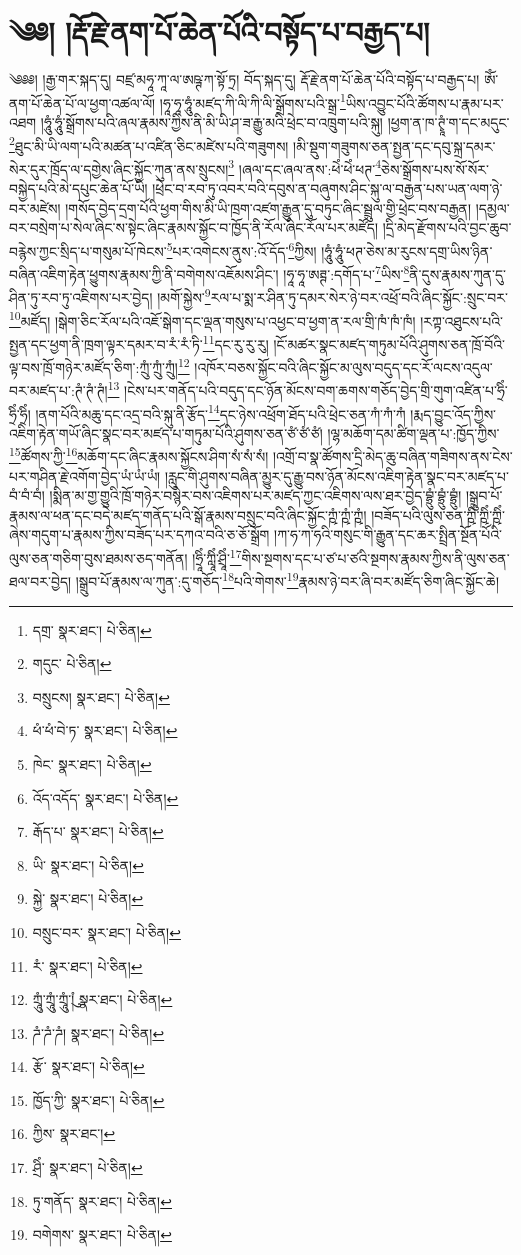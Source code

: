 \setcounter{footnote}{0} 
\chapter{༄༅། །རྡོ་རྗེ་ནག་པོ་ཆེན་པོའི་བསྟོད་པ་བརྒྱད་པ།}༄༅༅། །རྒྱ་གར་སྐད་དུ། བཛྲ་མཧཱ་ཀཱ་ལ་ཨཥྚ་ཀ་སྟོ་ཏྲ། བོད་སྐད་དུ། རྡོ་རྗེ་ནག་པོ་ཆེན་པོའི་བསྟོད་པ་བརྒྱད་པ། ཨོཾ་ནག་པོ་ཆེན་པོ་ལ་ཕྱག་འཚལ་ལོ། །ཧཱ་ཧཱ་ཧཱུཾ་མཛད་ཀི་ལི་ཀི་ལི་སྒྲོགས་པའི་སྒྲ་\footnote{དགྲ་  སྣར་ཐང་།  པེ་ཅིན། }ཡིས་འབྱུང་པོའི་ཚོགས་པ་རྣམ་པར་འཐག །ཧཱུཾ་ཧཱུཾ་སྒྲོགས་པའི་ཞལ་རྣམས་ཀྱིས་ནི་མི་ཡི་ཤ་ཟ་རྒྱུ་མའི་ཕྲེང་བ་འཁྲུག་པའི་སྐུ། །ཕྱག་ན་ཁ་ཊྭཱཾ་ག་དང་མདུང་\footnote{གདུང་  པེ་ཅིན། }ཐུང་མི་ཡི་ལག་པའི་མཚན་པ་འཛིན་ཅིང་མཛེས་པའི་གཟུགས། །མི་སྡུག་གཟུགས་ཅན་སྤྱན་དང་དབུ་སྐྲ་དམར་སེར་དུར་ཁྲོད་ལ་དགྱེས་ཞིང་སྐྱོང་ཀུན་ནས་སྲུངས།\footnote{བསྲུངས།  སྣར་ཐང་།  པེ་ཅིན། } །ཞལ་དང་ཞལ་ནས་:ཕེཾ་ཕེཾ་ཕཊ་\footnote{ཕཾ་ཕཾ་བེ་ཏ་  སྣར་ཐང་།  པེ་ཅིན། }ཅེས་སྒྲོགས་པས་སོ་སོར་བསྐྱེད་པའི་མེ་དཔུང་ཆེན་པོ་ཡི། །ཕྲེང་བ་རབ་ཏུ་འབར་བའི་དབུས་ན་བཞུགས་ཤིང་སྐུ་ལ་བརྒྱན་པས་ཡན་ལག་ཉེ་བར་མཛེས། །གསོད་བྱེད་དྲག་པོའི་ཕྱག་གིས་མི་ཡི་ཁྲག་འཛག་རྒྱུན་དུ་བཏུང་ཞིང་སྦྲུལ་གྱི་ཕྲེང་བས་བརྒྱན། །དམྱལ་བར་བསྲེག་པ་སེལ་ཞིང་ས་སྟེང་ཞིང་རྣམས་སྐྱོང་བ་ཁྱོད་ནི་རོལ་ཞིང་རོལ་པར་མཛོད། །དྲི་མེད་རྫོགས་པའི་བྱང་ཆུབ་བརྙེས་ཀྱང་སྲིད་པ་གསུམ་པོ་ཁེངས་\footnote{ཁེང་  སྣར་ཐང་།  པེ་ཅིན། }པར་འགེངས་ནུས་:འོ་དོད་\footnote{འོད་འདོད་  སྣར་ཐང་།  པེ་ཅིན། }ཀྱིས། །ཧཱུཾ་ཧཱུཾ་ཕཊ་ཅེས་མ་རུངས་དགྲ་ཡིས་ཉིན་བཞིན་འཇིག་རྟེན་ཕྱུགས་རྣམས་ཀྱི་ནི་བགེགས་འཇོམས་ཤིང་། །ཧཱ་ཧཱ་ཨཊྚ་:དགོད་པ་\footnote{རྒོད་པ་  སྣར་ཐང་།  པེ་ཅིན། }ཡིས་\footnote{ཡི་  སྣར་ཐང་།  པེ་ཅིན། }ནི་དུས་རྣམས་ཀུན་དུ་ཤིན་ཏུ་རབ་ཏུ་འཇིགས་པར་བྱེད། །མགོ་སྐྱེས་\footnote{སྐྱེ་  སྣར་ཐང་།  པེ་ཅིན། }རལ་པ་སྨ་ར་ཤིན་ཏུ་དམར་སེར་ཉེ་བར་འཕྲོ་བའི་ཞིང་སྐྱོང་:སྲུང་བར་\footnote{བསྲུང་བར་  སྣར་ཐང་།  པེ་ཅིན། }མཛོད། །སྒེག་ཅིང་རོལ་པའི་འཇོ་སྒེག་དང་ལྡན་གསུས་པ་འཕྱང་བ་ཕྱག་ན་རལ་གྲི་ཁཾ་ཁཾ་ཁཾ། །རཀྟ་འཐུངས་པའི་སྤྱན་དང་ཕྱག་ནི་ཁྲག་ལྟར་དམར་བ་རཾ་རཾ་ཏི་\footnote{རཾ་  སྣར་ཐང་།  པེ་ཅིན། }དང་རུ་རུ་རུ། །ངོ་མཚར་སྣང་མཛད་གཏུམ་པོའི་ཤུགས་ཅན་ཁྲོ་བོའི་ལྟ་བས་ཁྲོ་གཉེར་མཛོད་ཅིག་:ཀྲུཾ་ཀྲུཾ་ཀྲུཾ།\footnote{ཀྲཱུཾ་ཀྲཱུཾ་ཀྲཱུཾ་ུཾ།  སྣར་ཐང་།  པེ་ཅིན། } །འཁོར་བཅས་སྐྱོང་བའི་ཞིང་སྐྱོང་མ་ལུས་བདུད་དང་རོ་ལངས་འདུལ་བར་མཛད་པ་:ཊཾ་ཊཾ་ཊཾ།\footnote{ཌཾ་ཌཾ་ཌཾ།  སྣར་ཐང་།  པེ་ཅིན། } །ངེས་པར་གནོད་པའི་བདུད་དང་ཉོན་མོངས་བག་ཆགས་གཅོད་བྱེད་གྲི་གུག་འཛིན་པ་ཧྲིཾ་ཧྲིཾ་ཧྲིཾ། །ནག་པོའི་མཆུ་དང་འདྲ་བའི་སྐུ་ནི་རྩོད་\footnote{རྩོ་  སྣར་ཐང་།  པེ་ཅིན། }དང་ཉེས་འཕྲོག་ཐོད་པའི་ཕྲེང་ཅན་ཀཾ་ཀཾ་ཀཾ །རྨད་བྱུང་འོད་ཀྱིས་འཇིག་རྟེན་གཡོ་ཞིང་སྣང་བར་མཛད་པ་གཏུམ་པོའི་ཤུགས་ཅན་ཙཾ་ཙཾ་ཙཾ། །ལྷ་མཆོག་དམ་ཚིག་ལྡན་པ་:ཁྱོད་ཀྱིས་\footnote{ཁྱོད་ཀྱི་  སྣར་ཐང་།  པེ་ཅིན། }ཚོགས་ཀྱི་\footnote{ཀྱིས་  སྣར་ཐང་། }མཆོག་དང་ཞིང་རྣམས་སྐྱོངས་ཤིག་སཾ་སཾ་སཾ། །འགྲོ་བ་སྣ་ཚོགས་དྲི་མེད་ཆུ་བཞིན་གཟིགས་ནས་ངེས་པར་གཤིན་རྗེ་འགོག་བྱེད་ཡཾ་ཡཾ་ཡཾ། །རླུང་གི་ཤུགས་བཞིན་མྱུར་དུ་རྒྱུ་བས་ཉོན་མོངས་འཇིག་རྟེན་སྣང་བར་མཛད་པ་བཾ་བཾ་བཾ། །སྨིན་མ་གྱ་གྱུའི་ཁྲོ་གཉེར་བསྙེར་བས་འཇིགས་པར་མཛད་ཀྱང་འཇིགས་ལས་ཐར་བྱེད་བྷྲུཾ་བྷྲུཾ་བྷྲུཾ། །སྒྲུབ་པོ་རྣམས་ལ་ཕན་དང་བདེ་མཛད་གནོད་པའི་སྒོ་རྣམས་བསྲུང་བའི་ཞིང་སྐྱོང་ཀྵཾ་ཀྵཾ་ཀྵཾ། །བཟོད་པའི་ལུས་ཅན་ཀྵིཾ་ཀྵིཾ་ཀྵིཾ་ཞེས་གདུག་པ་རྣམས་ཀྱིས་བཟོད་པར་དཀའ་བའི་ཅ་ཅོ་སྒྲོག །ཀ་ཧ་ཀ་ཧའི་གསུང་གི་རྒྱུན་དང་ཆར་སྤྲིན་སྔོན་པོའི་ལུས་ཅན་གཅིག་བུས་ཐམས་ཅད་གནོན། །ཧྲཱིཾ་ཀླཱིཾ་ཤྲཱིཾ་\footnote{ཤྲིཾ་  སྣར་ཐང་།  པེ་ཅིན། }གིས་སྔགས་དང་པ་ཙ་པ་ཙའི་སྔགས་རྣམས་ཀྱིས་ནི་ལུས་ཅན་ཐལ་བར་བྱེད། །སྒྲུབ་པོ་རྣམས་ལ་ཀུན་:དུ་གཅོད་\footnote{ཏུ་གནོད་  སྣར་ཐང་།  པེ་ཅིན། }པའི་གེགས་\footnote{བགེགས་  སྣར་ཐང་།  པེ་ཅིན། }རྣམས་ཉེ་བར་ཞི་བར་མཛོད་ཅིག་ཞིང་སྐྱོང་ཆེ། 
